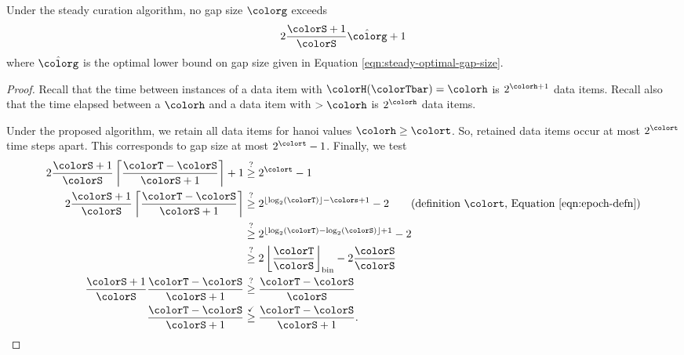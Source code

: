 \begin{theorem}
\label{thm:steady-gap-size}
Under the steady curation algorithm, no gap size $\colorg$ exceeds
\begin{align*}
2 \frac{\colorS + 1}{\colorS} \hat{\colorg} + 1
\end{align*}
where $\hat{\colorg}$ is the optimal lower bound on gap size given in Equation \ref{eqn:steady-optimal-gap-size}.
\end{theorem}
\begin{proof}
Recall that the time between instances of a data item with \hv{} $\colorH(\colorTbar) = \colorh$ is $2^{\colorh + 1}$ data items.
Recall also that the time elapsed between a \hv{} $\colorh$ and a data item with \hv{} $>\colorh$ is $2^{\colorh}$ data items.

Under the proposed algorithm, we retain all data items for hanoi values $\colorh \geq \colort$.
So, retained data items occur at most $2^{\colort}$ time steps apart.
This corresponds to gap size at most $2^{\colort} - 1$.
Finally, we test
\begin{align*}
2 \frac{\colorS + 1}{\colorS} \left\lceil \frac{\colorT - \colorS}{\colorS + 1} \right\rceil + 1
&\stackrel{?}{\geq}
2^{\colort} - 1\\
2 \frac{\colorS + 1}{\colorS} \left\lceil \frac{\colorT - \colorS}{\colorS + 1} \right\rceil
&\stackrel{?}{\geq}
2^{\left\lfloor \log_2(\colorT) \right\rfloor - \colors + 1} - 2 \tag{definition $\colort$, Equation \ref{eqn:epoch-defn}}\\
&\stackrel{?}{\geq}
2^{\left\lfloor \log_2(\colorT) - \log_2(\colorS) \right\rfloor + 1} - 2\\
&\stackrel{?}{\geq}
2\left\lfloor \frac{\colorT}{\colorS} \right\rfloor_{\mathrm{bin}} - 2\frac{\colorS}{\colorS}\\
\frac{\colorS + 1}{\colorS} \frac{\colorT - \colorS}{\colorS + 1}
&\stackrel{?}{\geq}
\frac{\colorT - \colorS}{\colorS}\\
\frac{\colorT - \colorS}{\colorS + 1}
&\stackrel{\checkmark}{\geq}
\frac{\colorT - \colorS}{\colorS + 1}.
\end{align*}
\end{proof}



